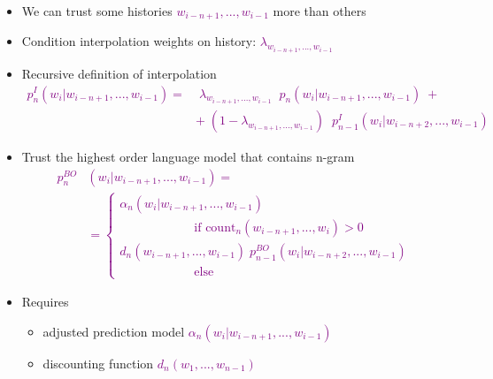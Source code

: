 \documentclass[landscape]{slides}
\newcommand{\maths}[1]{\textcolor{purple}{#1}}
\begin{document}
\vspace{10mm}
\begin{itemize}
\item We can trust some histories \maths{$w_{i-n+1},...,w_{i-1}$} more than others
\item Condition interpolation weights on history: \maths{$\lambda_{w_{i-n+1},...,w_{i-1}}$}
\item Recursive definition of interpolation
\maths{\begin{equation*}
\begin{split}
p^{I}_n(w_i|w_{i-n+1},...,w_{i-1}) = & \; \lambda_{w_{i-n+1},...,w_{i-1}} \;\; p_n(w_i|w_{i-n+1},...,w_{i-1}) \;+\\
	& + \;(1-\lambda_{w_{i-n+1},...,w_{i-1}}) \;\; p^I_{n-1}(w_i|w_{i-n+2},...,w_{i-1})
\end{split}
\end{equation*}}
\end{itemize}


\vspace{10mm}
\begin{itemize}
\item Trust the highest order language model that contains n-gram
\maths{\begin{equation*}
\begin{split}
p^{BO}_n&(w_i|w_{i-n+1},...,w_{i-1}) =\\
& = 
\begin{cases}
\alpha_n(w_i|w_{i-n+1},...,w_{i-1}) \\
\phantom{--- ---} \text{if count$_n(w_{i-n+1},...,w_i)>0$} \\[2mm]
d_n(w_{i-n+1},...,w_{i-1}) \; p^{BO}_{n-1}(w_i|w_{i-n+2},...,w_{i-1}) \\
\phantom{--- ---}\text{else}
\end{cases}
\end{split}
\end{equation*}}
\vspace{-15mm}
\item Requires 
\begin{itemize}
\item adjusted prediction model \maths{$\alpha_n(w_i|w_{i-n+1},...,w_{i-1})$}
\item discounting function \maths{$d_n(w_1,...,w_{n-1})$}
\end{itemize}
\end{itemize}
\end{document}
